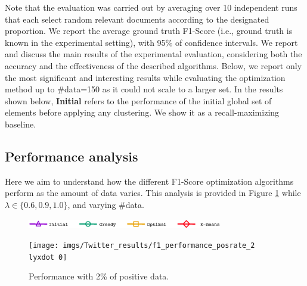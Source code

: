 Note that the evaluation was carried out by averaging over 10 independent runs that each select random relevant documents according to the designated proportion.  We report the average ground truth F1-Score (i.e., ground truth is known in the experimental setting), with 95\% of confidence intervals. 
We report and discuss the main results of the experimental evaluation, considering both the accuracy and the effectiveness of the described algorithms. %
Below, we report only the most significant and interesting results while evaluating the optimization method up to \#data=150 as it could not scale to a larger set. In the results shown below, {\bf Initial} refers to the performance of the initial global set of elements before applying any clustering.  We show it as a recall-maximizing baseline.




\subsection{Performance analysis}



Here we aim to understand how the different F1-Score optimization algorithms perform as the amount of data varies.  This analysis is provided in Figure  \ref{fig:F1_vs_Data_Twitter} while $\lambda \in \{0.6,0.9,1.0\}$, and  varying  \#data.






\begin{figure}[H]
\begin{centering}
\includegraphics[width=8.5cm]{imgs/legend7}
\par\end{centering}
\begin{centering}
{\texttt{[image: imgs/Twitter\_results/f1\_performance\_posrate\_2\\lyxdot 0]}}
\par\end{centering}
\caption{Performance with 2\% of positive data.}
\label{fig:F1_vs_Data_Twitter}
\end{figure}




